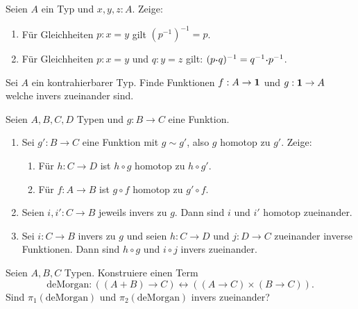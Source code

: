 \documentclass{uebung}
\begin{document}

\begin{exercise}
  Seien $A$ ein Typ und $x,y,z:A$. Zeige:
  \begin{enumerate}
  \item Für Gleichheiten $p:x=y$ gilt $\left(p^{-1}\right)^{-1}=p$.
  \item Für Gleichheiten $p:x=y$ und $q:y=z$ gilt: $(p\kon q)^{-1}=q^{-1}\kon p^{-1}$.
  \end{enumerate}
\end{exercise}

\begin{exercise}
  Sei $A$ ein kontrahierbarer Typ.
  Finde Funktionen $f:A\to\mathbf{1}$ und $g:\mathbf{1}\to A$ welche invers zueinander sind.
\end{exercise}

\begin{exercise}
  Seien $A,B,C,D$ Typen und $g:B\to C$ eine Funktion.
  \begin{enumerate}
    \item Sei $g':B\to C$ eine Funktion mit $g\sim g'$, also $g$ homotop zu $g'$.
    Zeige:
    \begin{enumerate}
      \item Für $h:C\to D$ ist $h\circ g$ homotop zu $h\circ g'$.
      \item Für $f:A\to B$ ist $g\circ f$ homotop zu $g'\circ f$.
    \end{enumerate}
  \item Seien $i,i':C\to B$ jeweils invers zu $g$.
    Dann sind $i$ und $i'$ homotop zueinander.
  \item Sei $i:C\to B$ invers zu $g$ und seien $h:C\to D$ und $j:D\to C$ zueinander inverse Funktionen.
    Dann sind $h\circ g$ und $i\circ j$ invers zueinander.
  \end{enumerate}
\end{exercise}

\begin{exercise}
  Seien $A,B,C$ Typen.
  Konstruiere einen Term 
  \begin{equation*}
    \mathrm{deMorgan}:((A+B)\to C) \leftrightarrow ((A\to C)\times (B\to C)).
  \end{equation*}
  Sind $\pi_1(\mathrm{deMorgan})$ und $\pi_2(\mathrm{deMorgan})$ invers zueinander?
\end{exercise}
\end{document}
